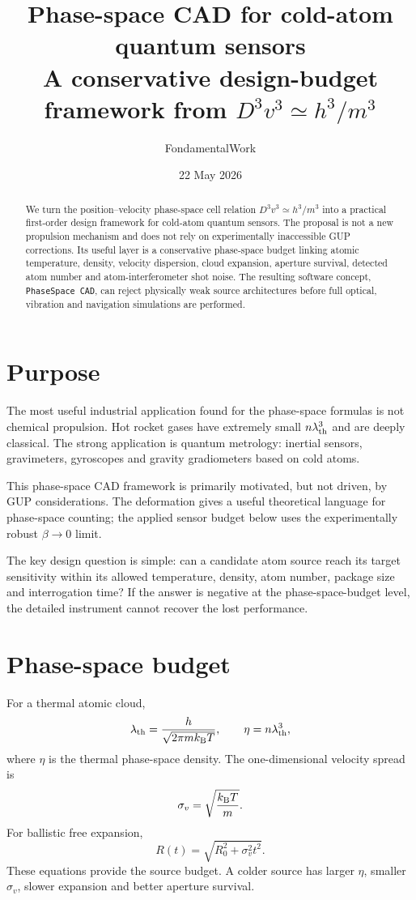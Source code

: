 \documentclass[11pt,a4paper]{article}
\title{\textbf{Phase-space CAD for cold-atom quantum sensors}\\
\large A conservative design-budget framework from $D^3v^3\simeq h^3/m^3$}
\author{FondamentalWork}
\date{22 May 2026}
\newcommand{\kb}{k_{\rm B}}
\newcommand{\lth}{\lambda_{\rm th}}
\begin{document}
\maketitle

\begin{abstract}
We turn the position--velocity phase-space cell relation
$D^3v^3\simeq h^3/m^3$ into a practical first-order design framework for
cold-atom quantum sensors. The proposal is not a new propulsion mechanism and
does not rely on experimentally inaccessible GUP corrections. Its useful layer
is a conservative phase-space budget linking atomic temperature, density,
velocity dispersion, cloud expansion, aperture survival, detected atom number
and atom-interferometer shot noise. The resulting software concept,
\texttt{PhaseSpace CAD}, can reject physically weak source architectures before
full optical, vibration and navigation simulations are performed.
\end{abstract}

\section{Purpose}

The most useful industrial application found for the phase-space formulas is
not chemical propulsion. Hot rocket gases have extremely small
$n\lambda_{\rm th}^3$ and are deeply classical. The strong application is
quantum metrology: inertial sensors, gravimeters, gyroscopes and gravity
gradiometers based on cold atoms.

This phase-space CAD framework is primarily motivated, but not driven, by GUP
considerations. The deformation gives a useful theoretical language for
phase-space counting; the applied sensor budget below uses the experimentally
robust $\beta\to0$ limit.

The key design question is simple: can a candidate atom source reach its target
sensitivity within its allowed temperature, density, atom number, package size
and interrogation time? If the answer is negative at the phase-space-budget
level, the detailed instrument cannot recover the lost performance.

\section{Phase-space budget}

For a thermal atomic cloud,
\begin{equation}
\lth=\frac{h}{\sqrt{2\pi m\kb T}},
\qquad
\eta=n\lth^3,
\end{equation}
where $\eta$ is the thermal phase-space density. The one-dimensional velocity
spread is
\begin{equation}
\sigma_v=\sqrt{\frac{\kb T}{m}}.
\end{equation}
For ballistic free expansion,
\begin{equation}
R(t)=\sqrt{R_0^2+\sigma_v^2t^2}.
\end{equation}
These equations provide the source budget. A colder source has larger
$\eta$, smaller $\sigma_v$, slower expansion and better aperture survival.
\end{document}
